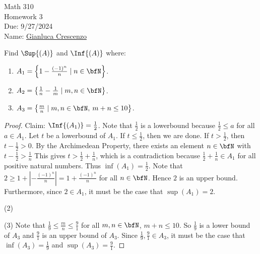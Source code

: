 \documentclass[10pt,twoside,openany]{memoir}
\begin{document}
\begin{center}
    { \Large Math 310 \\[0.1in]Homework 3 \\[0.1in]
    Due: 9/27/2024}\\[.25in]
    { Name:} {\underline{Gianluca Crescenzo\hspace*{2in}}}\\[0.15in]
    \end{center}
    \vspace{4pt}
    \begin{exercise}
        Find $\Sup{(A)}$ and $\Inf{(A)}$ where:
            \begin{enumerate}[label = (\arabic*)]
                \item $A_1 = \left\{1 - \frac{(-1)^n}{n} \mid n \in \bfN\right\}$.
                \item $A_2 = \left\{\frac{1}{n} - \frac{1}{m} \mid m,n \in \bfN\right\}$.
                \item $A_3 = \left\{ \frac{m}{n} \mid m,n \in \bfN,\hspace{2pt} m+n \leq 10\right\}$.
            \end{enumerate} 
    \end{exercise}
        {\color{red} \begin{proof}
            Claim: $\Inf{(A_1)} = \frac{1}{2}$. Note that $\frac{1}{2}$ is a lowerbound because $\frac{1}{2} \leq a$ for all $a \in A_1$. Let $t$ be a lowerbound of $A_1$. If $t \leq \frac{1}{2}$, then we are done. If $t>\frac{1}{2}$, then $t - \frac{1}{2} > 0$. By the Archimedean Property, there exists an element $n \in \bfN$ with $t - \frac{1}{2} > \frac{1}{n}$ This gives $t > \frac{1}{2} + \frac{1}{n}$, which is a contradiction because $\frac{1}{2}+\frac{1}{n} \in A_1$ for all positive natural numbers. Thus $\inf{(A_1)} = \frac{1}{2}$. Note that $2 \geq 1  + \left|  - \frac{(-1)^n}{n}\right| = 1 + \frac{(-1)^n}{n}$ for all $n \in \bfN$. Hence $2$ is an upper bound. Furthermore, since $2 \in A_1$, it must be the case that $\sup(A_1) = 2$.

            (2) 

            (3) Note that $\frac{1}{9} \leq \frac{m}{n} \leq \frac{9}{1}$ for all $m,n \in \bfN$, $m+n \leq 10$. So $\frac{1}{9}$ is a lower bound of $A_3$ and $\frac{9}{1}$ is an upper bound of $A_3$. Since $\frac{1}{9}, \frac{9}{1} \in A_3$, it must be the case that $\inf(A_3) = \frac{1}{9}$ and $\sup{(A_3)} = \frac{9}{1}$.


        \end{proof}}
\end{document}
